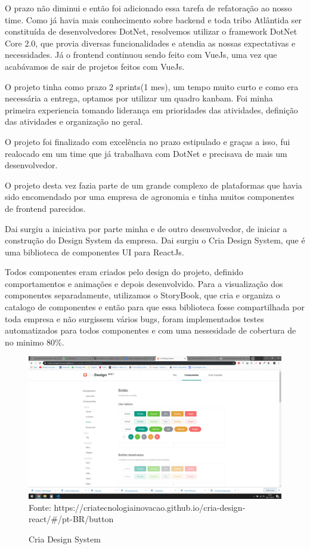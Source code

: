 O prazo não diminui e então foi adicionado essa tarefa de refatoração ao nosso time.
Como já havia mais conhecimento sobre backend e toda tribo Atlântida ser constituída de desenvolvedores DotNet, resolvemos utilizar o framework DotNet Core 2.0, que 
provia diversas funcionalidades e atendia as nossas expectativas e necessidades.
Já o frontend continuou sendo feito com VueJs, uma vez que acabávamos de sair de projetos feitos com VueJs.

O projeto tinha como prazo 2 sprints(1 mes), um tempo muito curto e como era necessária a entrega, optamos por utilizar um quadro kanbam.
Foi minha primeira experiencia tomando liderança em prioridades das atividades, definição das atividades e organização no geral.

O projeto foi finalizado com excelência no prazo estipulado e graças a isso, fui realocado em um time que já trabalhava com DotNet e precisava de mais um desenvolvedor.

O projeto desta vez fazia parte de um grande complexo de plataformas que havia sido encomendado por uma empresa de agronomia e tinha muitos componentes de frontend parecidos.

Dai surgiu a iniciativa por parte minha e de outro desenvolvedor, de iniciar a construção do Design System da empresa.
Dai surgiu o Cria Design System, que é uma biblioteca de componentes UI para ReactJs.

Todos componentes eram criados pelo design do projeto, definido comportamentos e animações e depois desenvolvido. Para a visualização dos componentes separadamente, utilizamos o StoryBook,
que cria e organiza o catalogo de componentes e então para que essa biblioteca fosse compartilhada por toda empresa e não surgissem vários bugs, foram implementados testes automatizados para todos componentes e com uma nessesidade de cobertura de no minimo 80\%.

\begin{figure}[H]
\centering
\caption{Cria Design System} %
\includegraphics[scale=0.3]{cria-design}\\  %
{\small Fonte: https://criatecnologiainovacao.github.io/cria-design-react/#/pt-BR/button} %
\label{fig:exemplo} %
\end{figure}

